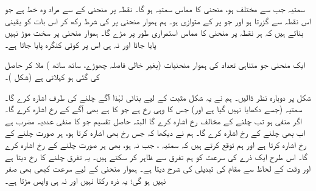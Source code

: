 سمتیہ  جب  سے مختلف ہو،  منحنی کا مماس سمتیہ ہو گا۔ نقطہ  پر  منحنی کے  سے مراد  وہ خط ہے جو اس نقطہ سے گزرتا ہو اور جو  پر   کے متوازی ہو۔  ہم ہموار منحنی    پر    کی شرط    رکھ    کر اس بات کو یقینی بناتے ہیں کہ ہر نقطہ پر منحنی کا مماس استمراری طور پر مڑے گا۔  ہموار منحنی پر   سخت  موڑ نہیں پایا جاتا اور نہ ہی اس پر کوئی کنگرہ پایا جاتا ہے۔

ایک منحنی  جو متناہی تعداد کی  ہموار  منحنیات  (بغیر خالی فاصلہ چھوڑے، ساتھ ساتھ )    ملا کر حاصل  کی گئی ہو     کہلاتی ہے (شکل )۔

شکل   پر  دوبارہ نظر ڈالیں۔ ہم نے یہ   شکل مثبت  کے لیے بنائی لہٰذا    آگے چلنے  کی طرف    اشارہ کرے گا۔سمتیہ  (جسے دکھایا نہیں گیا ہے اور)  جس کا وہی رخ ہے جو  کا ہے  بھی آگے کے  رخ اشارہ کرے گا۔ اگر  منفی ہو تب   چلنے کے مخالف  رخ اشارہ کرے گا  البتہ حاصل تقسیم   جو  کا منفی عددیہ مضرب  ہے اب بھی چلنے کے رخ اشارہ کرے  گا۔ ہم نے دیکھا کہ   جس رخ بھی اشارہ کرتا ہو،   ہر صورت چلنے کے رخ اشارہ کرتا ہے اور ہم توقع کرتے ہیں کہ سمتیہ  ، جب  نہ ہو،  بھی ہر صورت  چلنے کے رخ اشارہ کرے گا۔ اس طرح ایک ذرے  کی سرعت کو ہم  تفرق  سے ظاہر کر سکتے ہیں۔ یہ تفرق  چلنے کا  رخ دیتا ہے اور وقت کے لحاظ سے مقام  کی تبدیلی کی شرح  دیتا ہے۔  ہموار منحنی  کے  لیے سرعت کبھی بھی صفر نہیں ہو گی؛   یہ ذرہ رکتا نہیں اور نہ ہی  واپس مڑتا  ہے۔

